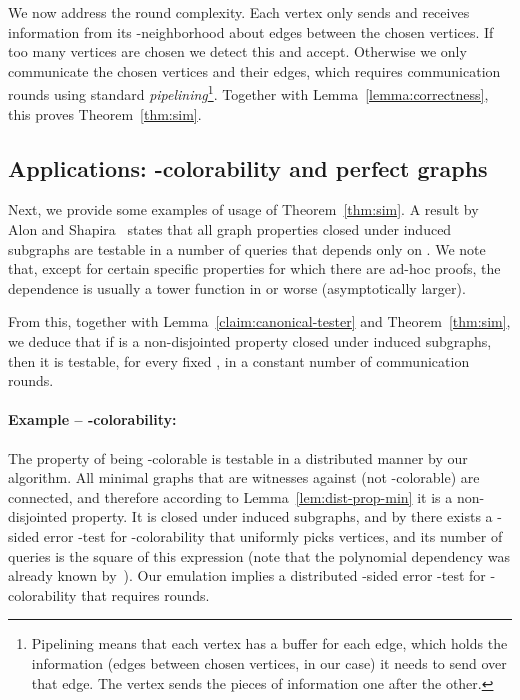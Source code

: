 \documentclass[11pt]{article}
\begin{document}
We now address the round complexity. Each vertex only sends and receives information from its -neighborhood about edges between the chosen vertices. If too many vertices are chosen we detect this and accept. Otherwise we only communicate the chosen vertices and their edges, which requires  communication rounds using standard \emph{pipelining}\footnote{Pipelining means that each vertex has a buffer for each edge, which holds the information (edges between chosen vertices, in our case) it needs to send over that edge. The vertex sends the pieces of information one after the other.}.
Together with Lemma~\ref{lemma:correctness}, this proves Theorem~\ref{thm:sim}.
	
\subsection{Applications: -colorability and perfect graphs}
\label{subsec:sim}
Next, we provide some examples of usage of Theorem~\ref{thm:sim}. A result by Alon and Shapira~\cite{AlonShapira} states that all graph properties closed under induced subgraphs are testable in a number of queries that depends only on . We note that, except for certain specific properties for which there are ad-hoc proofs, the dependence is usually a tower function in  or worse (asymptotically larger).







 From this, together with Lemma~\ref{claim:canonical-tester} and Theorem~\ref{thm:sim}, we deduce that if  is a non-disjointed property closed under induced subgraphs, then it is testable, for every fixed , in a constant number of communication rounds.

	
\paragraph{Example -- -colorability:} The property of being -colorable is testable in a distributed manner by our algorithm. All minimal graphs that are witnesses against  (not -colorable) are connected, and therefore according to Lemma~\ref{lem:dist-prop-min} it is a non-disjointed property. It is closed under induced subgraphs, and by \cite{AlonK02} there exists a -sided error -test for -colorability that uniformly picks  vertices, and its number of queries is the square of this expression (note that the polynomial dependency was already known by~\cite{GGR98}). Our emulation implies a distributed -sided error -test for -colorability that requires  rounds.
\end{document}
